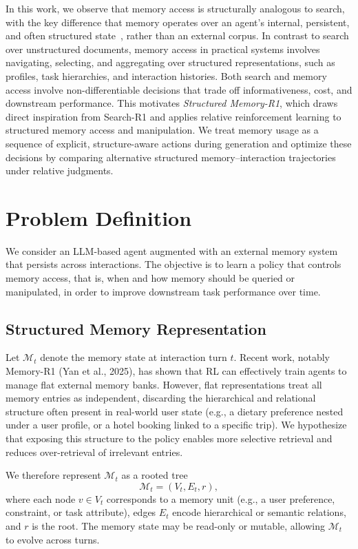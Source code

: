 \documentclass{article}
\begin{document}
In this work, we observe that memory access is structurally analogous to search, with the key difference that memory operates over an agent’s internal, persistent, and often structured state~\citep{park2023generative}, rather than an external corpus. In contrast to search over unstructured documents, memory access in practical systems involves navigating, selecting, and aggregating over structured representations, such as profiles, task hierarchies, and interaction histories. Both search and memory access involve non-differentiable decisions that trade off informativeness, cost, and downstream performance. This motivates \emph{Structured Memory-R1}, which draws direct inspiration from Search-R1 and applies relative reinforcement learning to structured memory access and manipulation. We treat memory usage as a sequence of explicit, structure-aware actions during generation and optimize these decisions by comparing alternative structured memory–interaction trajectories under relative judgments.\\

\section{Problem Definition}

We consider an LLM-based agent augmented with an external memory system that persists across interactions. The objective is to learn a policy that controls memory access, that is, when and how memory should be queried or manipulated, in order to improve downstream task performance over time.

\subsection{Structured Memory Representation}

Let $\mathcal{M}_t$ denote the memory state at interaction turn $t$.  
Recent work, notably Memory-R1 (Yan et al., 2025), has shown that RL can effectively train agents to manage flat external memory banks. However, flat representations treat all memory entries as independent, discarding the hierarchical and relational structure often present in real-world user state (e.g., a dietary preference nested under a user profile, or a hotel booking linked to a specific trip). We hypothesize that exposing this structure to the policy enables more selective retrieval and reduces over-retrieval of irrelevant entries.

We therefore represent $\mathcal{M}_t$ as a rooted tree
\[
\mathcal{M}_t = (V_t, E_t, r),
\]
where each node $v \in V_t$ corresponds to a memory unit (e.g., a user preference, constraint, or task attribute), edges $E_t$ encode hierarchical or semantic relations, and $r$ is the root. The memory state may be read-only or mutable, allowing $\mathcal{M}_t$ to evolve across turns.
\end{document}
